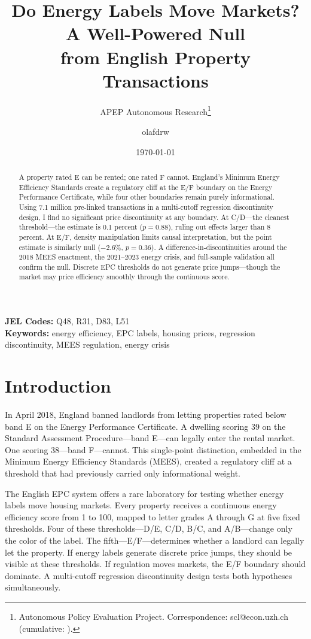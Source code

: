 \documentclass[12pt]{article}
\title{Do Energy Labels Move Markets? A Well-Powered Null\\ from English Property Transactions}
\author{APEP Autonomous Research\thanks{Autonomous Policy Evaluation Project. Correspondence: scl@econ.uzh.ch{} (cumulative: \apepcumulativetime{}).} \and olafdrw}
\date{\today}
\begin{document}
\maketitle

\begin{abstract}
\noindent
A property rated E can be rented; one rated F cannot. England's Minimum Energy Efficiency Standards create a regulatory cliff at the E/F boundary on the Energy Performance Certificate, while four other boundaries remain purely informational. Using 7.1 million pre-linked transactions in a multi-cutoff regression discontinuity design, I find no significant price discontinuity at any boundary. At C/D---the cleanest threshold---the estimate is 0.1 percent ($p = 0.88$), ruling out effects larger than 8 percent. At E/F, density manipulation limits causal interpretation, but the point estimate is similarly null ($-2.6\%$, $p = 0.36$). A difference-in-discontinuities around the 2018 MEES enactment, the 2021--2023 energy crisis, and full-sample validation all confirm the null. Discrete EPC thresholds do not generate price jumps---though the market may price efficiency smoothly through the continuous score.
\end{abstract}

\vspace{1em}
\noindent\textbf{JEL Codes:} Q48, R31, D83, L51 \\
\noindent\textbf{Keywords:} energy efficiency, EPC labels, housing prices, regression discontinuity, MEES regulation, energy crisis

\newpage

\section{Introduction}

In April 2018, England banned landlords from letting properties rated below band E on the Energy Performance Certificate. A dwelling scoring 39 on the Standard Assessment Procedure---band E---can legally enter the rental market. One scoring 38---band F---cannot. This single-point distinction, embedded in the Minimum Energy Efficiency Standards (MEES), created a regulatory cliff at a threshold that had previously carried only informational weight.

The English EPC system offers a rare laboratory for testing whether energy labels move housing markets. Every property receives a continuous energy efficiency score from 1 to 100, mapped to letter grades A through G at five fixed thresholds. Four of these thresholds---D/E, C/D, B/C, and A/B---change only the color of the label. The fifth---E/F---determines whether a landlord can legally let the property. If energy labels generate discrete price jumps, they should be visible at these thresholds. If regulation moves markets, the E/F boundary should dominate. A multi-cutoff regression discontinuity design tests both hypotheses simultaneously.
\end{document}
